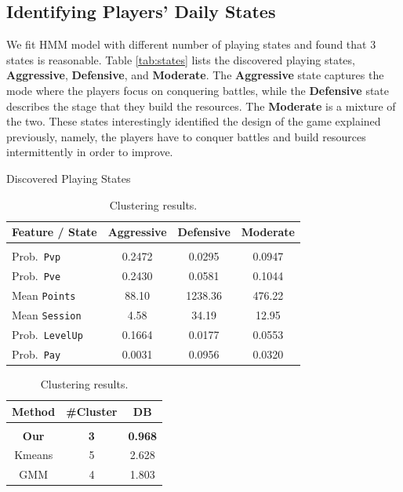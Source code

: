 \subsection{Identifying Players' Daily States}
We fit HMM model with different number of playing states and found that 3 states is reasonable. 
Table \ref{tab:states} lists the discovered playing states, \textbf{Aggressive}, 
\textbf{Defensive}, and \textbf{Moderate}.  The \textbf{Aggressive} state captures 
the mode where the players focus on conquering battles, while the \textbf{Defensive} 
state describes the stage that they build the resources. The \textbf{Moderate} is a mixture
of the two. These states interestingly identified the design of the game explained previously,
namely, the players have to conquer battles and build resources intermittently in order to improve. 

\begin{table}
\parbox{.65\linewidth}{
\centering
\caption{Discovered Playing States}
\label{tab:states}
\centering
\scalebox{0.8}
{
\begin{tabular}{lccc} 
\bf Feature / State & \textbf{Aggressive}  & \textbf{Defensive}  &  \textbf{Moderate} 
\\ \hline \\
 Prob.\ \texttt{Pvp}     &  0.2472  & 0.0295 &  0.0947  \\
 Prob.\ \texttt{Pve}     &  0.2430  & 0.0581 &  0.1044 \\
 Mean \texttt{Points} &  88.10   & 1238.36 &  476.22 \\
 Mean \texttt{Session}&  4.58    &  34.19  & 12.95 \\
 Prob.\ \texttt{LevelUp} &  0.1664  & 0.0177  & 0.0553 \\
 Prob.\ \texttt{Pay}     &  0.0031  & 0.0956  & 0.0320 \\
\end{tabular}
}
}
\hfill
\parbox{.35\linewidth}{
\centering
\caption{Clustering results.}
\label{tab:clustering}
\begin{tabular}{ccc}
\bf Method & \bf \#Cluster & \bf DB
\\ \hline \\
{\bf Our}     & {\bf 3}  &  {\bf 0.968} \\  
Kmeans  &  5  &  2.628 \\
GMM     &  4  &  1.803 
\end{tabular}
}
\end{table}

